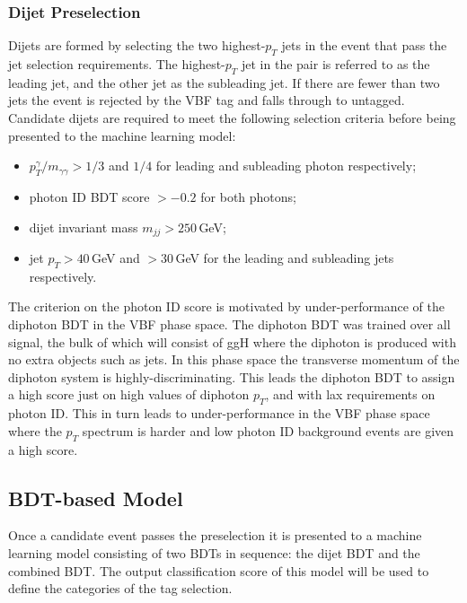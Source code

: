 \subsubsection{Dijet Preselection}
Dijets are formed by selecting the two highest-$p_T$ jets in the event that pass the jet selection requirements. The highest-$p_T$ jet in the pair is referred to as the leading jet, and the other jet as the subleading jet. If there are fewer than two jets the event is rejected by the VBF tag and falls through to untagged. 
Candidate dijets are required to meet the following selection criteria before being presented to the machine learning model:
\begin{itemize}[noitemsep]
    \item $p^{\gamma}_{T}/m_{\gamma\gamma} > 1/3$ and $1/4$ for leading and subleading photon respectively;
    \item photon ID BDT score $> -0.2$ for both photons;
    \item dijet invariant mass $m_{jj} > 250$\,GeV;
    \item jet $p_{T} > 40$\,GeV and $> 30$\,GeV for the leading and subleading jets respectively.
\end{itemize}

The criterion on the photon ID score is motivated by under-performance of the diphoton BDT in the VBF phase space. 
The diphoton BDT was trained over all signal, the bulk of which will consist of ggH where the diphoton is produced with no extra objects such as jets. 
In this phase space the transverse momentum of the diphoton system is highly-discriminating. 
This leads the diphoton BDT to assign a high score just on high values of diphoton $p_T$, and with lax requirements on photon ID. 
This in turn leads to under-performance in the VBF phase space where the $p_T$ spectrum is harder and low photon ID background events are given a high score. 








\subsection{BDT-based Model}
Once a candidate event passes the preselection it is presented to a machine learning model consisting of two BDTs in sequence: the dijet BDT and the combined BDT. 
The output classification score of this model will be used to define the categories of the tag selection. 

